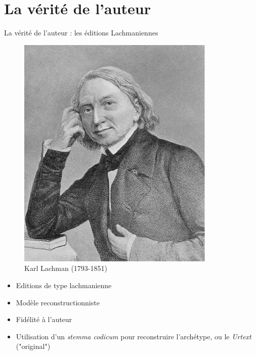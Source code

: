 \documentclass[11pt]{beamer}
\begin{document}
\section{La vérité de l'auteur}
\begin{frame}{La vérité de l'auteur : les éditions Lachmaniennes}
    \begin{minipage}{.4\textwidth}
        \begin{figure}
            \centering
            \includegraphics[width=1\linewidth]{img/lachman.png}
            \caption{Karl Lachman (1793-1851)}
        \end{figure} 
    \end{minipage}%
    \hfill
    \begin{minipage}{.6\textwidth}
         \begin{itemize}
            \item Editions de type lachmanienne
            \item Modèle reconstructionniste
            \item Fidélité à l'auteur
            \item Utilisation d'un \textit{stemma codicum} pour reconstruire l'archétype, ou le \textit{Urtext} ("original")
        \end{itemize}
    \end{minipage}
\end{frame}
\end{document}

